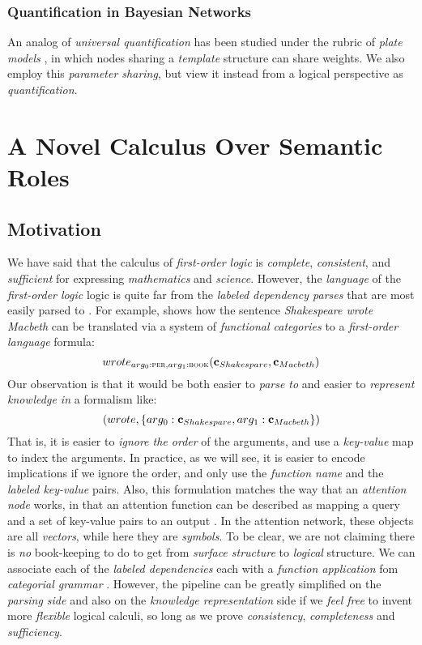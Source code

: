 \documentclass[11pt]{article}
\newcommand{\cvariable}{{\bf c}}
\begin{document}
\subsubsection*{Quantification in Bayesian Networks}
An analog of {\em universal quantification} has been studied under the rubric of {\em plate models} \cite{koller2009probabilistic}, in which nodes sharing a {\em template} structure can share weights.
We also employ this {\em parameter sharing}, but view it instead from a logical perspective as {\em quantification}.
\section{A Novel Calculus Over Semantic Roles}
\subsection{Motivation}
We have said that the calculus of {\em first-order logic} is {\em complete}, {\em consistent}, and {\em sufficient} for expressing {\em mathematics} and {\em science}.
However, the {\em language} of the {\em first-order logic} logic is quite far from the {\em labeled dependency parses} that are most easily parsed to \cite{eisner1996bilexical, mcdonald2005non, zhang2011transition}.
For example, \cite{Lewis2013} shows how the sentence {\em Shakespeare wrote Macbeth} can be translated via a system of {\em functional categories} to a {\em first-order language} formula:
\begin{equation}
    wrote_{arg_0:\textsc{per}, arg_1:\textsc{book}}(\cvariable_{Shakespare}, \cvariable_{Macbeth})
\end{equation}
Our observation is that it would be both easier to {\em parse to} and easier to {\em represent knowledge in} a formalism like:
\begin{equation}
(wrote, \left\{ arg_0: \cvariable_{Shakespare}, arg_1:\cvariable_{Macbeth}\right\})
\end{equation}
That is, it is easier to {\em ignore the order} of the arguments, and use a {\em key-value} map to index the arguments.
In practice, as we will see, it is easier to encode implications if we ignore the order, and only use the {\em function name} and the {\em labeled key-value} pairs.
Also, this formulation matches the way that an {\em attention node} works, in that an attention function can be described as mapping a query and a set of key-value pairs to an output \cite{Vaswani2017}.
In the attention network, these objects are all {\em vectors}, while here they are {\em symbols}.
To be clear, we are not claiming there is {\em no} book-keeping to do to get from {\em surface structure} to {\em logical} structure.
We can associate each of the {\em labeled dependencies} each with a {\em function application} fom {\em categorial grammar} \cite{BarHillel1953}.
However, the pipeline can be greatly simplified on the {\em parsing side} and also on the {\em knowledge representation} side if we {\em feel free} to invent more {\em flexible} logical calculi, so long as we prove {\em consistency}, {\em completeness} and {\em sufficiency}.
\end{document}
